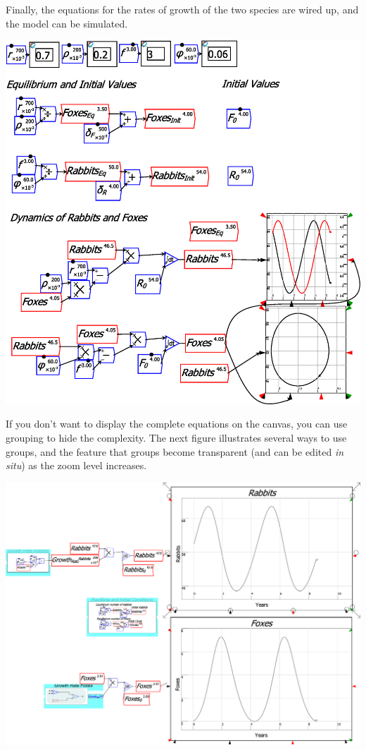 Finally, the equations for the rates of growth of the two species
are wired up, and the model can be simulated.

\includegraphics{images/PredatorPreyRabbitsFoxes04Equations}

If you don't want to display the complete equations on the canvas,
you can use grouping to hide the complexity. The next figure illustrates
several ways to use groups, and the feature that groups become transparent
(and can be edited \emph{in situ}) as the zoom level increases.

\includegraphics[width=15cm]{images/PredatorPreyRabbitsFoxes05Grouping}

